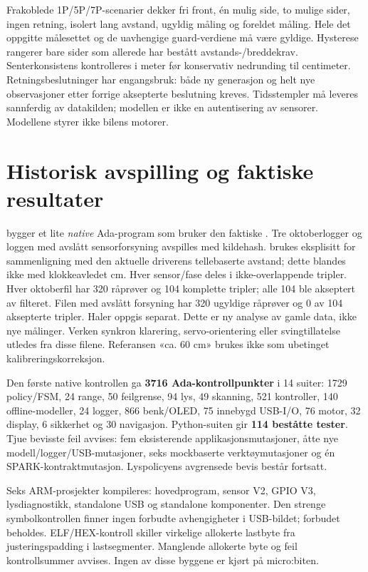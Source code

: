 Frakoblede 1P/5P/7P-scenarier dekker fri front, én mulig side, to mulige
sider, ingen retning, isolert lang avstand, ugyldig måling og foreldet
måling. Hele det oppgitte målesettet og de uavhengige guard-verdiene må
være gyldige. Hysterese rangerer bare sider som allerede har bestått
avstands-/breddekrav. Senterkonsistens kontrolleres i meter før konservativ
nedrunding til centimeter. Retningsbeslutninger har engangsbruk: både
ny generasjon og helt nye observasjoner etter forrige aksepterte beslutning
kreves. Tidsstempler må leveres sannferdig av datakilden; modellen er ikke
en autentisering av sensorer. Modellene styrer ikke bilens motorer.

\section{Historisk avspilling og faktiske resultater}
 bygger et lite \emph{native} Ada-program
som bruker den faktiske . Tre oktoberlogger
og loggen med avslått sensorforsyning avspilles med kildehash.
 brukes eksplisitt for sammenligning med den aktuelle
driverens tellebaserte avstand; dette blandes ikke med klokkeavledet cm.
Hver sensor/fase deles i ikke-overlappende tripler. Hver oktoberfil har
320 råprøver og 104 komplette tripler; alle 104 ble akseptert av filteret.
Filen med avslått forsyning har 320 ugyldige råprøver og 0 av 104 aksepterte
tripler. Haler oppgis separat. Dette er ny analyse av gamle data, ikke
nye målinger. Verken synkron klarering, servo-orientering eller svingtillatelse
utledes fra disse filene. Referansen «ca. 60 cm» brukes ikke som ubetinget
kalibreringskorreksjon.

Den første native kontrollen ga \textbf{3716 Ada-kontrollpunkter} i 14 suiter:
1729 policy/FSM, 24 range, 50 feilgrense, 94 lys, 49 skanning,
521 kontroller, 140 offline-modeller, 24 logger, 866 benk/OLED,
75 innebygd USB-I/O, 76 motor, 32 display, 6 sikkerhet og 30 navigasjon.
Python-suiten gir \textbf{114 beståtte tester}. Tjue bevisste feil avvises:
fem eksisterende applikasjonsmutasjoner, åtte nye modell/logger/USB-mutasjoner,
seks mockbaserte verktøymutasjoner og én SPARK-kontraktmutasjon.
Lyspolicyens avgrensede bevis består fortsatt.

Seks ARM-prosjekter kompileres: hovedprogram, sensor V2, GPIO V3,
lysdiagnostikk, standalone USB og standalone komponenter. Den strenge symbolkontrollen finner ingen forbudte avhengigheter i
USB-bildet; forbudet beholdes. ELF/HEX-kontroll skiller virkelige allokerte lastbyte fra
justeringspadding i lastsegmenter. Manglende allokerte byte og feil
kontrollsummer avvises. Ingen av disse byggene er kjørt på micro:biten.

